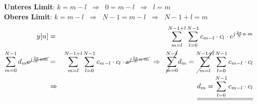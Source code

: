 \begin{uebsp}
\begin{Answer}
\begin{enumerate}[a)]
            \textbf{Unteres Limit}: $k=m-l\;\;\Rightarrow\;\;0=m-l\;\;\Rightarrow\;\;l=m$\\
            \textbf{Oberes Limit}: $k=m-l\;\;\Rightarrow\;\;N-1=m-l\;\;\Rightarrow\;\;N-1+l=m$
            \begin{eqnarray*}
                y[n]&=& \sum_{m=l}^{N-1+l}\sum_{l=0}^{N-1}c_{m-l}\cdot c_l\cdot e^{j\frac{2\pi}{N}n\cdot m}\\
                \sum_{m=0}^{N-1}d_m\cancel{e^{j\frac{2\pi}{N}nm}}&=& \sum_{m=l}^{N-1+l}\sum_{l=0}^{N-1}c_{m-l}\cdot c_l\cdot \cancel{e^{j\frac{2\pi}{N}n\cdot m}}\;\Rightarrow\;\;
                \cancel{\sum_{m=0}^{N-1}}d_m= \cancel{\sum_{m=l}^{N-1+l}}\sum_{l=0}^{N-1}c_{m-l}\cdot c_l\\
                &\Rightarrow& \underline{\underline{d_m=\sum_{l=0}^{N-1}c_{m-l}\cdot c_l}}
            \end{eqnarray*}
    \end{enumerate}
\end{Answer}
\end{uebsp}
